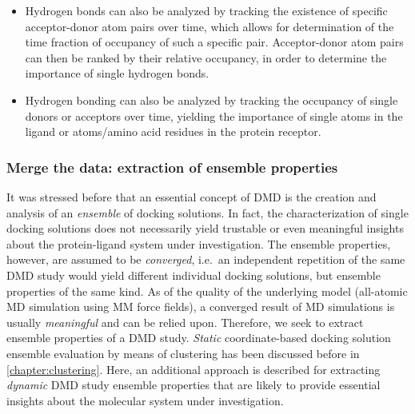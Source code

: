 \begin{itemize}
\begin{itemize}
\item Hydrogen bonds can also be analyzed by tracking the existence of specific
acceptor-donor atom pairs over time, which allows for determination of the time
fraction of occupancy of such a specific pair. Acceptor-donor atom pairs can
then be ranked by their relative occupancy, in order to determine the importance
of single hydrogen bonds.

\item Hydrogen bonding can also be analyzed by tracking the occupancy of single
donors or acceptors over time, yielding the importance of single atoms in the
ligand or atoms/amino acid residues in the protein receptor.
\end{itemize}

\end{itemize}


\subsubsection{Merge the data: extraction of ensemble properties}

It was stressed before that an essential concept of DMD is the creation and
analysis of an \textit{ensemble} of docking solutions. In fact, the
characterization of single docking solutions does not necessarily yield
trustable or even meaningful insights about the protein-ligand system under
investigation. The ensemble properties, however, are assumed to be
\textit{converged}, i.e.\ an independent repetition of the same DMD study would
yield different individual docking solutions, but ensemble properties of the
same kind. As of the quality of the underlying model (all-atomic MD simulation
using MM force fields), a converged result of MD simulations is usually
\textit{meaningful} and can be relied upon. Therefore, we seek to extract
ensemble properties of a DMD study. \textit{Static} coordinate-based docking
solution ensemble evaluation by means of clustering has been discussed before in
\cref{chapter:clustering}. Here, an additional approach is described for
extracting \textit{dynamic} DMD study ensemble properties that are likely to
provide essential insights about the molecular system under investigation.

